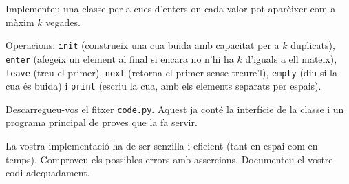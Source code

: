 

\Statement

Implementeu una classe per a cues d'enters on cada valor pot aparèixer com a màxim $k$ vegades. 

\medskip

Operacions: \texttt{init} (construeix una cua buida amb capacitat per a $k$ duplicats), 
\texttt{enter} (afegeix un element al final si encara no n'hi ha $k$ d'iguals a ell mateix), \texttt{leave} (treu el primer), \texttt{next} (retorna el primer sense treure'l), \texttt{empty} (diu si la cua és buida) i \texttt{print} (escriu la cua, amb els elements separats per espais).

\medskip

Descarregueu-vos el fitxer \texttt{code.py}. Aquest ja conté la interfície de la classe i un programa principal de proves que la fa servir.

\medskip

La vostra implementació ha de ser senzilla i eficient (tant en espai com en temps). Comproveu els possibles errors amb assercions. Documenteu el vostre codi adequadament.

\Sample
